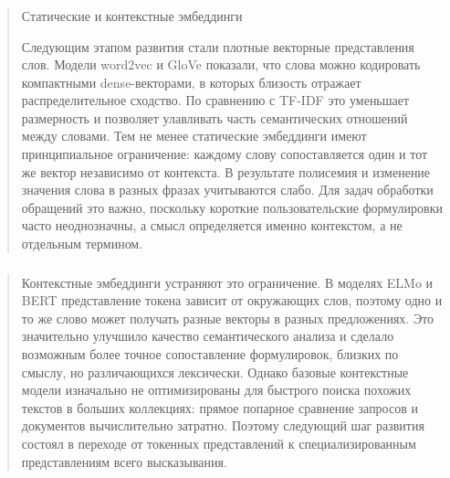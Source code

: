 \hypertarget{section-2}{%
\subsubsection{}\label{section-2}}

\begin{quote}
Статические и контекстные эмбеддинги

Следующим этапом развития стали плотные векторные представления слов.
Модели word2vec и GloVe показали, что слова можно кодировать компактными
dense-векторами, в которых близость отражает распределительное сходство.
По сравнению с TF-IDF это уменьшает размерность и позволяет улавливать
часть семантических отношений между словами. Тем не менее статические
эмбеддинги имеют принципиальное ограничение: каждому слову
сопоставляется один и тот же вектор независимо от контекста. В
результате полисемия и изменение значения слова в разных фразах
учитываются слабо. Для задач обработки обращений это важно, поскольку
короткие пользовательские формулировки часто неоднозначны, а смысл
определяется именно контекстом, а не отдельным термином.
\end{quote}

\hypertarget{section-3}{%
\subsubsection{}\label{section-3}}

\begin{quote}
Контекстные эмбеддинги устраняют это ограничение. В моделях ELMo и BERT
представление токена зависит от окружающих слов, поэтому одно и то же
слово может получать разные векторы в разных предложениях. Это
значительно улучшило качество семантического анализа и сделало возможным
более точное сопоставление формулировок, близких по смыслу, но
различающихся лексически. Однако базовые контекстные модели изначально
не оптимизированы для быстрого поиска похожих текстов в больших
коллекциях: прямое попарное сравнение запросов и документов
вычислительно затратно. Поэтому следующий шаг развития состоял в
переходе от токенных представлений к специализированным представлениям
всего высказывания.
\end{quote}

\hypertarget{section-4}{%
\subsubsection{}\label{section-4}}

